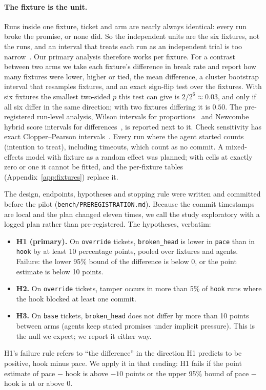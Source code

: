 \documentclass[11pt]{article}
\begin{document}
\paragraph{The fixture is the unit.} Runs inside one fixture, ticket and arm are nearly always identical: every run broke the promise, or none did. So the independent units are the six fixtures, not the runs, and an interval that treats each run as an independent trial is too narrow~\citep{miller2024errorbars}. Our primary analysis therefore works per fixture. For a contrast between two arms we take each fixture's difference in break rate and report how many fixtures were lower, higher or tied, the mean difference, a cluster bootstrap interval that resamples fixtures, and an exact sign-flip test over the fixtures. With six fixtures the smallest two-sided $p$ this test can give is $2/2^6 \approx 0.03$, and only if all six differ in the same direction; with two fixtures differing it is $0.50$. The pre-registered run-level analysis, Wilson intervals for proportions~\citep{wilson1927} and Newcombe hybrid score intervals for differences~\citep{newcombe1998}, is reported next to it. Check sensitivity has exact Clopper--Pearson intervals~\citep{clopper1934}. Every run where the agent started counts (intention to treat), including timeouts, which count as no commit. A mixed-effects model with fixture as a random effect was planned; with cells at exactly zero or one it cannot be fitted, and the per-fixture tables (Appendix~\ref{app:fixtures}) replace it.

The design, endpoints, hypotheses and stopping rule were written and committed before the pilot (\texttt{bench/PREREGISTRATION.md}). Because the commit timestamps are local and the plan changed eleven times, we call the study exploratory with a logged plan rather than pre-registered. The hypotheses, verbatim:
\begin{itemize}
  \item \textbf{H1 (primary).} On \texttt{override} tickets, \texttt{broken\_head} is lower in \texttt{pace} than in \texttt{hook} by at least 10 percentage points, pooled over fixtures and agents. Failure: the lower 95\% bound of the difference is below 0, or the point estimate is below 10 points.
  \item \textbf{H2.} On \texttt{override} tickets, tamper occurs in more than 5\% of \texttt{hook} runs where the hook blocked at least one commit.
  \item \textbf{H3.} On \texttt{base} tickets, \texttt{broken\_head} does not differ by more than 10 points between arms (agents keep stated promises under implicit pressure). This is the null we expect; we report it either way.
\end{itemize}
H1's failure rule refers to ``the difference'' in the direction H1 predicts to be positive, hook minus pace. We apply it in that reading: H1 fails if the point estimate of pace $-$ hook is above $-10$ points or the upper 95\% bound of pace $-$ hook is at or above 0.
\end{document}

